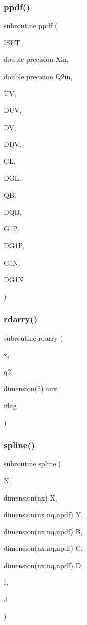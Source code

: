 \subsubsection{\texorpdfstring{ppdf()}{ppdf()}}
{\footnotesize\ttfamily subroutine ppdf (\begin{DoxyParamCaption}\item[{}]{I\+S\+ET,  }\item[{double precision}]{Xin,  }\item[{double precision}]{Q2in,  }\item[{}]{UV,  }\item[{}]{D\+UV,  }\item[{}]{DV,  }\item[{}]{D\+DV,  }\item[{}]{GL,  }\item[{}]{D\+GL,  }\item[{}]{QB,  }\item[{}]{D\+QB,  }\item[{}]{G1P,  }\item[{}]{D\+G1P,  }\item[{}]{G1N,  }\item[{}]{D\+G1N }\end{DoxyParamCaption})}

\mbox{\label{polpdf_8f_aa6768afb7e596138ae832b1324adb155}} 
\subsubsection{\texorpdfstring{rdarry()}{rdarry()}}
{\footnotesize\ttfamily subroutine rdarry (\begin{DoxyParamCaption}\item[{}]{x,  }\item[{}]{q2,  }\item[{dimension(5)}]{aux,  }\item[{}]{iflag }\end{DoxyParamCaption})}

\mbox{\label{polpdf_8f_a45eb8bcc97d5f2c125774ad51b11de67}} 
\subsubsection{\texorpdfstring{spline()}{spline()}}
{\footnotesize\ttfamily subroutine spline (\begin{DoxyParamCaption}\item[{}]{N,  }\item[{dimension(nx)}]{X,  }\item[{dimension(nx,nq,npdf)}]{Y,  }\item[{dimension(nx,nq,npdf)}]{B,  }\item[{dimension(nx,nq,npdf)}]{C,  }\item[{dimension(nx,nq,npdf)}]{D,  }\item[{}]{I,  }\item[{}]{J }\end{DoxyParamCaption})}

